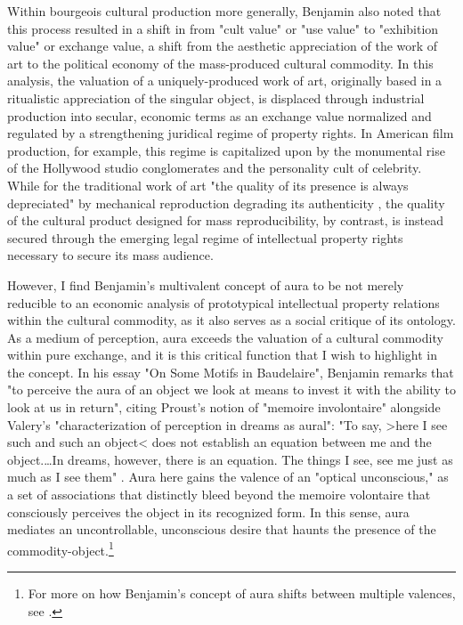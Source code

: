Within bourgeois cultural production more generally, Benjamin also noted that this process resulted in a shift in from "cult value" or "use value" to "exhibition value" or exchange value, a shift from the aesthetic appreciation of the work of art to the political economy of the mass-produced cultural commodity. In this analysis, the valuation of a uniquely-produced work of art, originally based in a ritualistic appreciation of the singular object, is displaced through industrial production into secular, economic terms as an exchange value normalized and regulated by a strengthening juridical regime of property rights. In American film production, for example, this regime is capitalized upon by the monumental rise of the Hollywood studio conglomerates and the personality cult of celebrity. While for the traditional work of art "the quality of its presence is always depreciated" by mechanical reproduction degrading its authenticity \autocite[221]{Benjamin1969-ed}, the quality of the cultural product designed for mass reproducibility, by contrast, is instead secured through the emerging legal regime of intellectual property rights necessary to secure its mass audience.

However, I find Benjamin's multivalent concept of aura to be not merely reducible to an economic analysis of prototypical intellectual property relations within the cultural commodity, as it also serves as a social critique of its ontology. As a medium of perception, aura exceeds the valuation of a cultural commodity within pure exchange, and it is this critical function that I wish to highlight in the concept. In his essay "On Some Motifs in Baudelaire", Benjamin remarks that "to perceive the aura of an object we look at means to invest it with the ability to look at us in return", citing Proust's notion of "memoire involontaire" alongside Valery's "characterization of perception in dreams as aural": "To say, >here I see such and such an object< does not establish an equation between me and the object.…In dreams, however, there is an equation. The things I see, see me just as much as I see them" \autocite[188-9]{Benjamin1969-ed}. Aura here gains the valence of an "optical unconscious," as a set of associations that distinctly bleed beyond the memoire volontaire that consciously perceives the object in its recognized form. In this sense, aura mediates an uncontrollable, unconscious desire that haunts the presence of the commodity-object.\footnote{
  For more on how Benjamin's concept of aura shifts between multiple valences, see \cite{Hansen2008-ej}.
}

